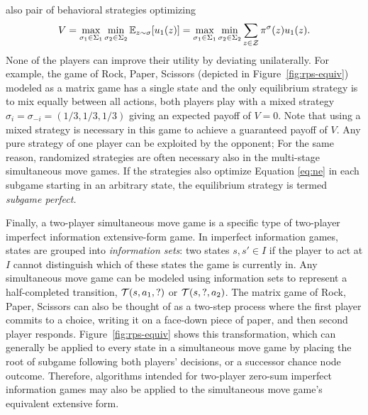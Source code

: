 also pair of behavioral strategies optimizing
\begin{equation}\label{eq:ne}
V = \max_{\sigma_1 \in \Sigma_1} \min_{\sigma_2 \in \Sigma_2} \mathbb{E}_{z \sim \sigma}[u_1(z)]
  = \max_{\sigma_1 \in \Sigma_1} \min_{\sigma_2 \in \Sigma_2} \sum_{z \in \mathcal{Z}} \pi^\sigma(z) u_1(z).
\end{equation}
None of the players can improve their utility by deviating unilaterally.
For example, the game of Rock, Paper, Scissors (depicted in Figure~\ref{fig:rps-equiv}) modeled as a matrix game has a single state and the only equilibrium strategy is to mix equally between
all actions, \ie both players play with a mixed strategy $\sigma_i = \sigma_{-i} = (1/3, 1/3, 1/3)$ giving an expected payoff of
$V = 0$.
Note that using a mixed strategy is necessary in this game to achieve a guaranteed payoff of $V$.
Any pure strategy of one player can be exploited by the opponent; 
For the same reason, randomized strategies are often necessary also in the multi-stage simultaneous move games.
If the strategies also optimize Equation \ref{eq:ne} in each subgame starting in an arbitrary state, the equilibrium strategy
is termed {\it subgame perfect.}

Finally, a two-player simultaneous move game is a specific type of two-player imperfect information extensive-form game.
In imperfect information
games, states are grouped into {\it information sets}: two states $s, s' \in I$ if the player
to act at $I$ cannot distinguish which of these states the game is currently in. Any simultaneous move game can be modeled
using information sets to represent a half-completed transition, \ie $\mathcal{T}(s, a_1, ?)$ or $\mathcal{T}(s, ?, a_2)$.
The matrix game of Rock, Paper, Scissors can also be thought of as a two-step process where the first player commits
to a choice, writing it on a face-down piece of paper, and then second player responds. Figure~\ref{fig:rps-equiv} shows this
transformation, which can generally be applied to every state in a simultaneous move game by placing the root of subgame following
both players' decisions, or a successor chance node outcome.
Therefore, algorithms intended for two-player zero-sum imperfect information games may also be applied to the
simultaneous move game's equivalent extensive form.

